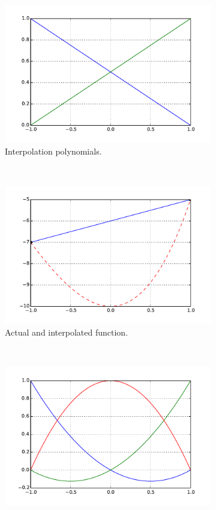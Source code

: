 \begin{figure}[H]
\centering
	\begin{subfigure}[b]{0.45\textwidth}\qquad
		\includegraphics[width=\textwidth]{lineal.pdf}
		\caption{Interpolation polynomials. }
	\end{subfigure}\,
%
	\begin{subfigure}[b]{0.45\textwidth}\qquad
		\includegraphics[width=\textwidth]{interlin.pdf}
		\caption{Actual and interpolated function.}
	\end{subfigure}\\
%
\centering
	\begin{subfigure}[b]{0.45\textwidth}\qquad
		\includegraphics[width=\textwidth]{quadra.pdf}

\end{subfigure}
\end{figure}
